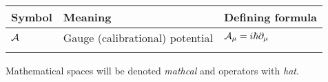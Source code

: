 

\begin{tabular} {@{}C{1.9cm}@{}p{8cm}@{}C{3.77cm}}
	\toprule
	\textbf{Symbol}& \textbf{Meaning}& \textbf{Defining formula}\\\bottomrule
	$\mathcal{A}$ & Gauge (calibrational) potential & $\mathcal{A}_\mu=i\hbar \partial_\mu$ \\

\bottomrule
{}
\end{tabular}

Mathematical spaces will be denoted \emph{mathcal} and operators with \emph{hat}.